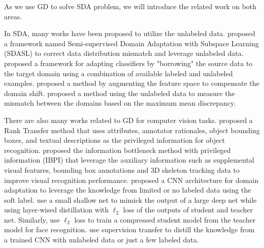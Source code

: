 As we use GD to solve SDA problem, we will introduce the related work on both areas.

In SDA, many works have been proposed to utilize the unlabeled data.  \cite{yao2015semi} proposed a framework named Semi-supervised Domain Adaptation with Subspace Learning (SDASL) to correct data distribution mismatch and leverage unlabeled data. \cite{Donahue_2013_CVPR} proposed a framework for adapting classifiers by "borrowing" the source data to the target domain using a combination of available labeled and unlabeled examples. \cite{daume2010frustratingly} proposed a method by augmenting the feature space to compensate the domain shift. \cite{duan2012visual} proposed a method using the unlabeled data to measure the mismatch between the domains based on the maximum mean discrepancy.

There are also many works related to GD for computer vision tasks. \cite{Sharmanska_2013_ICCV} proposed a Rank Transfer method that uses attributes, annotator
rationales, object bounding boxes, and textual descriptions as the privileged information for object recognition. \cite{Motiian_2016_CVPR} proposed {the information bottleneck method with privileged information (IBPI)} that leverage the auxiliary information such as supplemental visual features, bounding box annotations and 3D skeleton tracking data to improve visual recognition performance. \cite{Tzeng_2015_ICCV} proposed a CNN architecture for domain adaptation to leverage the knowledge from limited or no labeled data using the soft label. \cite{urban2016deep} use a small shallow net to mimick the output of a large deep net while using layer-wised distillation with $\ell_2$ loss of the outputs of student and teacher net. Similarly, \cite{luo2016face} use $\ell_2$ loss to train a compressed student model from the teacher model for face recognition. \cite{Gupta_2016_CVPR} use supervision transfer to distill the knowledge from a trained CNN with unlabeled data or just a few labeled data.